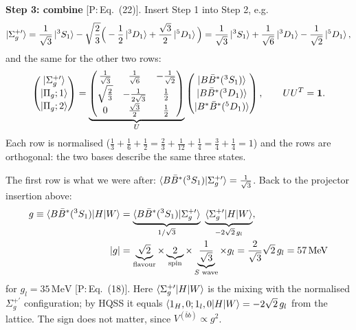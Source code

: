 \documentclass[11pt,a4paper]{article}
\newcommand{\tagP}[1]{\textcolor{blue!65!black}{\textsf{\small[P:\,#1]}}}
\renewcommand{\VQQ}{V^{(\bar bb)}}
\renewcommand{\MeV}{\,\mathrm{MeV}}
\newenvironment{aiadd}{\par}{\par}
\begin{document}
\begin{aiadd}
	\textbf{Step 3: combine} \tagP{Eq.~(22)}. Insert Step 1 into Step 2, e.g.
	\[
		\ket{\Sigma_g^{+\prime}}=\frac{1}{\sqrt3}\ket{^3S_1}-\sqrt{\frac23}\Big(-\frac12\ket{^3D_1}+\frac{\sqrt3}{2}\ket{^5D_1}\Big)
		=\frac{1}{\sqrt3}\ket{^3S_1}+\frac{1}{\sqrt6}\ket{^3D_1}-\frac{1}{\sqrt2}\ket{^5D_1},
	\]
	and the same for the other two rows:
	\begin{equation}
		\begin{pmatrix}\ket{\Sigma_g^{+\prime}}\\[0.5mm] \ket{\Pi_g;1}\\[0.5mm] \ket{\Pi_g;2}\end{pmatrix}
		=\underbrace{\begin{pmatrix}
				\frac{1}{\sqrt3} & \frac{1}{\sqrt6}   & -\frac{1}{\sqrt2} \\[1mm]
				\sqrt{\frac23}   & -\frac{1}{2\sqrt3} & \frac12           \\[1mm]
				0                & \frac{\sqrt3}{2}   & \frac12
			\end{pmatrix}}_{U}
		\begin{pmatrix}\ket{B\bar B^*(^3S_1)}\\[0.5mm] \ket{B\bar B^*(^3D_1)}\\[0.5mm] \ket{B^*\bar B^*(^5D_1)}\end{pmatrix},
		\qquad UU^T=\bold 1 .
		\label{eq:U}
	\end{equation}
	Each row is normalised ($\frac13+\frac16+\frac12=\frac23+\frac1{12}+\frac14=\frac34+\frac14=1$) and the rows are orthogonal: the two bases describe the same three states.

	The first row is what we were after: $\braket{B\bar B^*(^3S_1)|\Sigma_g^{+\prime}}=\frac{1}{\sqrt3}$. Back to the projector insertion above:
	\begin{align*}
		g\equiv\braket{B\bar B^*(^3S_1)|H|W}
		    & =\underbrace{\braket{B\bar B^*(^3S_1)|\Sigma_g^{+\prime}}}_{1/\sqrt3}\ \underbrace{\braket{\Sigma_g^{+\prime}|H|W}}_{-2\sqrt2\,g_l},                                                                   \\
		|g| & =\underbrace{\sqrt2}_{\text{flavour}}\times\underbrace{2}_{\text{spin}}\times\underbrace{\frac{1}{\sqrt3}}_{S\text{ wave}}\times g_l=\frac{2}{\sqrt3}\sqrt2\,g_l=57\MeV
	\end{align*}
	for $g_l=35\MeV$ \tagP{Eq.~(18)}. Here $\braket{\Sigma_g^{+\prime}|H|W}$ is the mixing with the normalised $\Sigma_g^{+\prime}$ configuration; by HQSS it equals $\braket{1_H,0;1_l,0|H|W}=-2\sqrt2\,g_l$ from the lattice. The sign does not matter, since $\VQQ\propto g^2$.
\end{aiadd}
\end{document}
